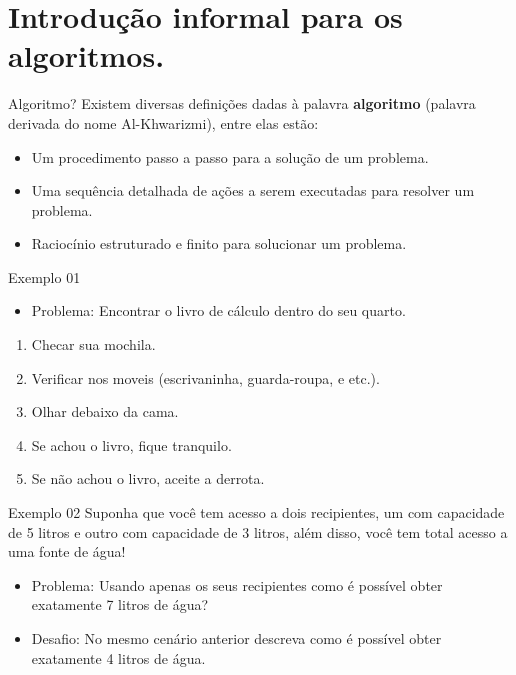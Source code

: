 \section{Introdução informal para os algoritmos.}

\begin{frame}{Algoritmo?}
  Existem diversas definições dadas à palavra \textbf{algoritmo} (palavra derivada do nome Al-Khwarizmi), entre elas estão:
  \begin{itemize}
    \item Um procedimento passo a passo para a solução de um problema.
    \item Uma sequência detalhada de ações a serem executadas para resolver um problema.
    \item Raciocínio estruturado e finito para solucionar um problema.
  \end{itemize}
\end{frame}

\begin{frame}{Exemplo 01}
  \begin{itemize}
    \item Problema: Encontrar o livro de cálculo dentro do seu quarto.
  \end{itemize}
  \pause
  \begin{enumerate}
    \item Checar sua mochila.
    \item Verificar nos moveis (escrivaninha, guarda-roupa, e etc.).
    \item Olhar debaixo da cama.
    \item Se achou o livro, fique tranquilo.
    \item Se não achou o livro, aceite a derrota.
  \end{enumerate}
\end{frame}

\begin{frame}{Exemplo 02}
  Suponha que você tem acesso a dois recipientes, um com capacidade de 5 litros e outro com capacidade de 3 litros, além disso, você tem total acesso a uma fonte de água!
  \begin{itemize}
    \item Problema: Usando apenas os seus recipientes como é possível obter exatamente 7 litros de água?
    \pause
    \item {\color{red} Desafio}: No mesmo cenário anterior descreva como é possível obter exatamente 4 litros de água.
  \end{itemize}
\end{frame}

